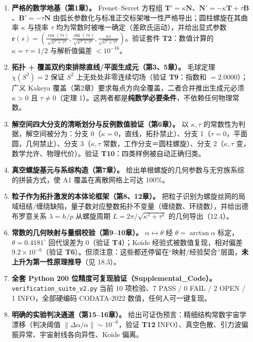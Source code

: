 \begin{enumerate}
\def\labelenumi{\arabic{enumi}.}
\tightlist
\item
  \textbf{严格的数学地基（第1章）。} Frenet--Serret 方程组
  \(\mathbf{T}'=\kappa\mathbf{N}\)、\(\mathbf{N}'=-\kappa\mathbf{T}+\tau\mathbf{B}\)、\(\mathbf{B}'=-\tau\mathbf{N}\)
  由弧长参数化与标准正交标架唯一性严格导出；圆柱螺旋在其曲率 \(\kappa\)
  与挠率 \(\tau\) 均为常数时被唯一确定（差欧氏运动），并给出显式参数
  \(\mathbf{r}(s)=(\frac{\cos(\tau s)}{\sqrt{\kappa^2+\tau^2}},\frac{\sin(\tau s)}{\sqrt{\kappa^2+\tau^2}},\frac{\kappa s}{\sqrt{\kappa^2+\tau^2}})\)。验证套件
  \textbf{T2}：数值计算的 \(\kappa=\tau=1/2\) 与解析值偏差
  \(<10^{-16}\)。
\item
  \textbf{拓扑 + 覆盖双约束排除直线/平面生成元（第3、5章）。} 毛球定理
  \(\chi(S^2)=2\) 保证 \(S^2\) 上无处处非零连续切场（验证
  \textbf{T9}：指数和 \(=2.0000\)）；广义 Kakeya
  覆盖（第2章）要求每点方向全覆盖，二者合并推出生成元必须 \(\kappa>0\)
  且 \(\tau\neq0\)（定理
  1）。这两者都是\textbf{纯数学必要条件}，不依赖任何物理常数。
\item
  \textbf{解空间四大分支的清晰划分与反例数值验证（第6章）。} 以
  \(\kappa,\tau\) 的常数性为判据，解空间被分为：分支
  0（\(\kappa=0\)，直线，拓扑禁止）、分支
  1（\(\tau=0\)，平面圆，几何禁止）、分支 3（\(\kappa,\tau\)
  常数，工作分支＝圆柱螺旋）、分支 2（\(\kappa,\tau\)
  变，数学允许、物理代价）。验证 \textbf{T10}：四类样例被自动正确归类。
\item
  \textbf{真空螺旋基元与系综构造（第7章）。}
  给出单根螺旋的几何参数与无穷族系综的拼装方式，使 A1
  覆盖在离散网格上可达 100\%。
\item
  \textbf{粒子作为拓扑激发的本体论框架（第8、12章）。}
  把粒子识别为螺旋丝网的局域纽结/缠绕缺陷，量子数对应整数拓扑不变量（缠绕数、环绕数），并给出德布罗意关系
  \(\lambda=h/p\) 从螺旋周期 \(L=2\pi/\sqrt{\kappa^2+\tau^2}\)
  的几何导出（12.4）。
\item
  \textbf{常数的几何映射与量纲校验（第9--10章）。}
  \(\alpha\leftrightarrow\theta\) 经 \(\theta=\arctan\alpha\)
  标定，\(\theta=0.4181^\circ\) 回代误差为 0（验证 \textbf{T4}）；Koide
  经验式被数值复现，相对偏差 \(9.2\times10^{-6}\)（验证
  \textbf{T6}）。但须注意：这些都还停留在``映射/经验契合''层面，\textbf{未上升为第一性原理推导}（见
  18.3）。
\item
  \textbf{全套 Python 200 位精度可复现验证（Supplemental\_Code）。}
  \texttt{verification\_suite\_v2.py} 当前 10 项检验、7 PASS / 0 FAIL /
  2 OPEN / 1 INFO，全部硬编码 CODATA‑2022 数值，任何人可一键复现。
\item
  \textbf{明确的实验判决通道（第15--16章）。}
  给出可证伪预言：精细结构常数宇宙学漂移（判决阈值
  \(\|\Delta\alpha/\alpha\|\sim10^{-6}\)，验证 \textbf{T12}
  INFO）、真空色散、引力波偏振异常、宇宙射线各向异性、Koide 偏离。
\end{enumerate}


